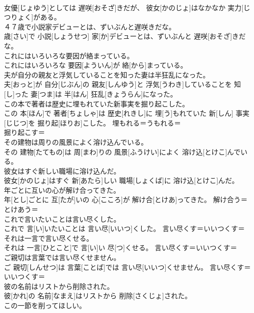 \documentclass[8pt]{extreport}
\begin{document}
\begin{CJK}{UTF8}{min}
{\\	女優[じょゆう]としては 遅咲[おそざ]きだが、 彼女[かのじょ]はなかなか 実力[じつりょく]がある。	
\\	４７歳で小説家デビューとは、ずいぶんと遅咲きだな。	
\\	歳[さい]で 小説[しょうせつ] 家[か]デビューとは、ずいぶんと 遅咲[おそざ]きだな。	
\\	これにはいろいろな要因が絡まっている。	
\\	これにはいろいろな 要因[よういん]が 絡[から]まっている。	
\\	夫が自分の親友と浮気していることを知った妻は半狂乱になった。	
\\	夫[おっと]が 自分[じぶん]の 親友[しんゆう]と 浮気[うわき]していることを 知[し]った 妻[つま]は 半[はん] 狂乱[きょうらん]になった。	
\\	この本で著者は歴史に埋もれていた新事実を掘り起こした。	
\\	この 本[ほん]で 著者[ちょしゃ]は 歴史[れきし]に 埋[う]もれていた 新[しん] 事実[じじつ]を 掘り起[ほりお]こした。	埋もれる＝うもれる＝ 
\\	掘り起こす＝ 
\\	その建物は周りの風景によく溶け込んでいる。	
\\	その 建物[たてもの]は 周[まわ]りの 風景[ふうけい]によく 溶け込[とけこ]んでいる。	
\\	彼女はすぐ新しい職場に溶け込んだ。	
\\	彼女[かのじょ]はすぐ 新[あたら]しい 職場[しょくば]に 溶け込[とけこ]んだ。	
\\	年ごとに互いの心が解け合ってきた。	
\\	年[とし]ごとに 互[たが]いの 心[こころ]が 解け合[とけあ]ってきた。	解け合う＝とけあう＝ 
\\	これで言いたいことは言い尽くした。	
\\	これで 言[い]いたいことは 言い尽[いいつ]くした。	言い尽くす＝いいつくす＝ 
\\	それは一言で言い尽くせる。	
\\	それは 一言[ひとこと]で 言[い]い 尽[つ]くせる。	言い尽くす＝いいつくす＝ 
\\	ご親切は言葉では言い尽くせません。	
\\	ご 親切[しんせつ]は 言葉[ことば]では 言い尽[いいつ]くせません。	言い尽くす＝いいつくす＝ 
\\	彼の名前はリストから削除された。	
\\	彼[かれ]の 名前[なまえ]はリストから 削除[さくじょ]された。	
\\	この一節を削ってほしい。	
}
\end{CJK}
\end{document}
